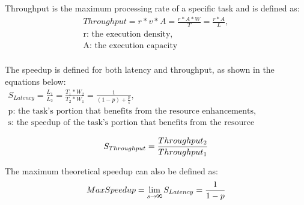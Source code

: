 Throughput is the maximum processing rate of a specific task and is defined as:
\begin{equation}
	\label{eqn:throughput}
	\begin{split}
		Throughput = r * v * A = \frac{r * A * W}{T} = \frac{r * A}{L},\\
		\mbox{r: the execution density},\\
		\mbox{A: the execution capacity}\\
	\end{split}
\end{equation}

The speedup is defined for both latency and throughput, as shown in the equations below:
\begin{equation}
	\label{eqn:latency-speedup}
	\begin{split}
		S_{Latency} = \frac{L_1}{L_2} = \frac{T_1 * W_2}{T_2 * W_1} = \frac{1}{(1 - p) + \frac{p}{s}},\\
		\mbox{p: the task's portion that benefits from the resource enhancements},\\
		\mbox{s: the speedup of the task's portion that benefits from the resource enhancements}\\
	\end{split}
\end{equation}
\begin{equation}
	\label{eqn:throughput-speedup}
	S_{Throughput} = \frac{Throughput_2}{Throughput_1}\\
\end{equation}

The maximum theoretical speedup can also be defined as:
\begin{equation}
	\label{eqn:max-speedup}
	MaxSpeedup = \lim_{s \to \infinity} S_{Latency} = \frac{1}{1 - p}\\
\end{equation}

